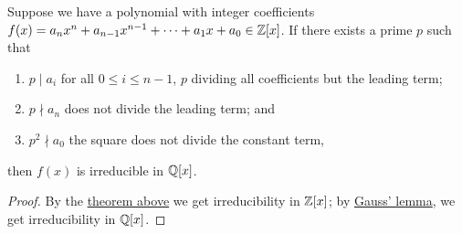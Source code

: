 \begin{corollary}\label{cor:eisenstein-criterion}
    Suppose we have a polynomial with integer coefficients
    \(f(x) = a_n x^n + a_{n-1}x^{n-1} + \cdots + a_1 x + a_0 \in \mathbb{Z}[x]\).
    If there exists a prime \(p\) such that
    \begin{enumerate}[label={(\alph*)}, itemsep=0mm]
        \item \(p \mid a_i\) for all \(0 \leq i \leq n-1\),
            \(p\) dividing all coefficients but the leading term;
        \item \(p \nmid a_n\) does not divide the leading term; and
        \item \(p^2 \nmid a_0\) the square does not divide the constant term,
    \end{enumerate}
    then \(f(x)\) is irreducible in \(\mathbb{Q}[x]\).
\end{corollary}
\begin{proof}
    By the \hyperref[thm:eisenstein-criterion]{theorem above}
    we get irreducibility in \(\mathbb{Z}[x]\);
    by \hyperref[lem:gauss-irreducible]{Gauss' lemma},
    we get irreducibility in \(\mathbb{Q}[x]\).
\end{proof}

